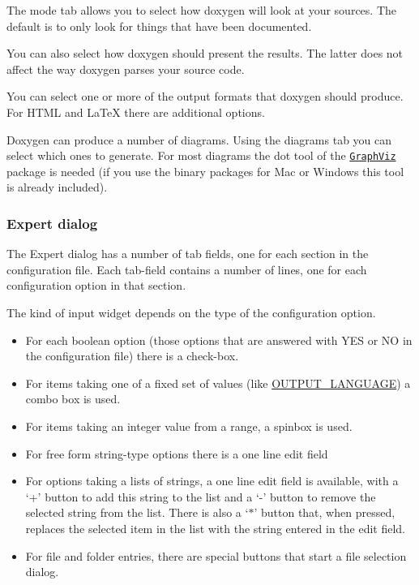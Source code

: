  The mode tab allows you to select how doxygen will look at your sources. The default is to only look for things that have been documented.

You can also select how doxygen should present the results. The latter does not affect the way doxygen parses your source code.

 You can select one or more of the output formats that doxygen should produce. For HTML and LaTeX there are additional options.

 Doxygen can produce a number of diagrams. Using the diagrams tab you can select which ones to generate. For most diagrams the dot tool of the \href{http://www.graphviz.org}{\tt GraphViz} package is needed (if you use the binary packages for Mac or Windows this tool is already included).

\subsubsection*{Expert dialog}

The Expert dialog has a number of tab fields, one for each section in the configuration file. Each tab-field contains a number of lines, one for each configuration option in that section.

The kind of input widget depends on the type of the configuration option. \begin{itemize}
\item For each boolean option (those options that are answered with YES or NO in the configuration file) there is a check-box. \item For items taking one of a fixed set of values (like \hyperlink{config_cfg_output_language}{OUTPUT\_\-LANGUAGE}) a combo box is used. \item For items taking an integer value from a range, a spinbox is used. \item For free form string-type options there is a one line edit field \item For options taking a lists of strings, a one line edit field is available, with a `+' button to add this string to the list and a `-' button to remove the selected string from the list. There is also a `$\ast$' button that, when pressed, replaces the selected item in the list with the string entered in the edit field. \item For file and folder entries, there are special buttons that start a file selection dialog. \end{itemize}



